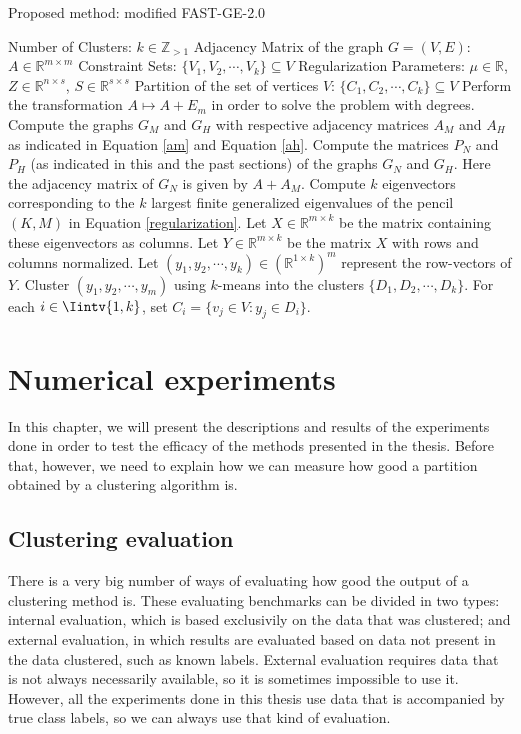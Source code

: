 \begin{algorithm}
\caption{Proposed method: modified FAST-GE-2.0}\label{proposed_algorithm}
\begin{algorithmic}[1]
   \Require 
      \Statex Number of Clusters: $k \in \mathbb Z_{>1}$
      \Statex Adjacency Matrix of the graph $G=(V,E)$: $A \in \mathbb R ^ {m \times m}$ 
      \Statex Constraint Sets: $\{ V_1, V_2, \cdots, V_k \} \subseteq V$
      \Statex Regularization Parameters: $\mu \in \mathbb R$, $Z \in \mathbb R ^{n \times s}$, $S \in \mathbb R ^{s \times s}$
   \Ensure 
      \Statex Partition of the set of vertices $V$: $\{ C_1, C_2, \cdots, C_k \} \subseteq V$
      \vspace{0.2 cm}
   \State Perform the transformation $A \longmapsto A + E_m$ in order to solve the problem with degrees.
   \State Compute the graphs $G_M$ and $G_H$ with respective adjacency matrices $A_M$ and $A_H$ as indicated in Equation \vref{am} and Equation \vref{ah}.
   \State Compute the matrices $P_N$ and $P_H$ (as indicated in this and the past sections) of the graphs $G_N$ and $G_H$. Here the adjacency matrix of $G_N$ is given by $A + A_M$.
   \State Compute $k$ eigenvectors corresponding to the $k$ largest finite generalized eigenvalues of the pencil $(K,M)$ in Equation \vref{regularization}. Let $X \in \mathbb R ^{m \times k}$ be the matrix containing these eigenvectors as columns.
   \State Let $Y \in \mathbb R ^{m \times k}$ be the matrix $X$ with rows and columns normalized.
   \State Let $(y_1, y_2, \cdots, y_k) \in (\mathbb R^{1 \times k})^m$ represent the row-vectors of $Y$.
   \State Cluster $(y_1, y_2, \cdots, y_m)$ using $k$-means into the clusters $ \{ D_1, D_2, \cdots, D_k \}$.
   \State For each $i \in \Iintv{1,k}$, set $C_i = \{ v_j \in V: y_j \in D_i \}$.
\end{algorithmic}
\end{algorithm}



\chapter{Numerical experiments} \label{numexp}
In this chapter, we will present the descriptions and results of the experiments done in order to test the efficacy of the methods presented in the thesis. 
Before that, however, we need to explain how we can measure how good a partition obtained by a clustering algorithm is.

\section{Clustering evaluation}
There is a very big number of ways of evaluating how good the output of a clustering method is.
These evaluating benchmarks can be divided in two types: internal evaluation, which is based exclusivily on the data that was clustered; and external evaluation, in which results are evaluated based on data not present in the data clustered, such as known labels.
External evaluation requires data that is not always necessarily available, so it is sometimes impossible to use it.
However, all the experiments done in this thesis use data that is accompanied by true class labels, so we can always use that kind of evaluation.

